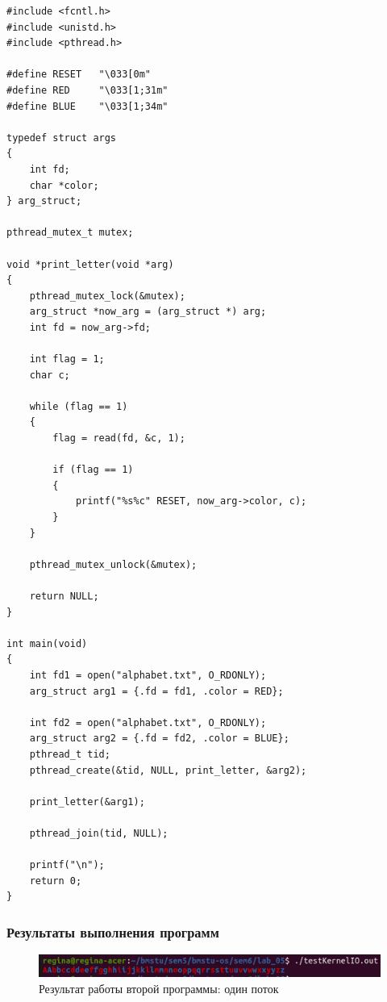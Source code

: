 \begin{center}
    \captionsetup{justification=raggedright,singlelinecheck=off}
    \begin{lstlisting}[label=lst:kernelIO2,caption=Два потока]
#include <fcntl.h>
#include <unistd.h>
#include <pthread.h>

#define RESET   "\033[0m"
#define RED     "\033[1;31m"
#define BLUE    "\033[1;34m"

typedef struct args
{
    int fd;
    char *color;
} arg_struct;

pthread_mutex_t mutex;

void *print_letter(void *arg) 
{
    pthread_mutex_lock(&mutex);
    arg_struct *now_arg = (arg_struct *) arg;
    int fd = now_arg->fd;

    int flag = 1;
    char c;

    while (flag == 1) 
    {
        flag = read(fd, &c, 1);

        if (flag == 1)
        {
            printf("%s%c" RESET, now_arg->color, c);
        }
    }

    pthread_mutex_unlock(&mutex);

    return NULL;
}

int main(void)
{
    int fd1 = open("alphabet.txt", O_RDONLY);
    arg_struct arg1 = {.fd = fd1, .color = RED};

    int fd2 = open("alphabet.txt", O_RDONLY);
    arg_struct arg2 = {.fd = fd2, .color = BLUE};
    pthread_t tid;
    pthread_create(&tid, NULL, print_letter, &arg2);

    print_letter(&arg1);

    pthread_join(tid, NULL);

    printf("\n");
    return 0;
}
\end{lstlisting}
\end{center}

\subsubsection{Результаты выполнения программ}

\begin{figure}[H]
	\begin{center}
		\includegraphics[scale=0.35]{img/kernelIO1.png}
	\end{center}
	\captionsetup{justification=centering}
	\caption{Результат работы второй программы: один поток}
	\label{img:kernelIO1}
\end{figure}

